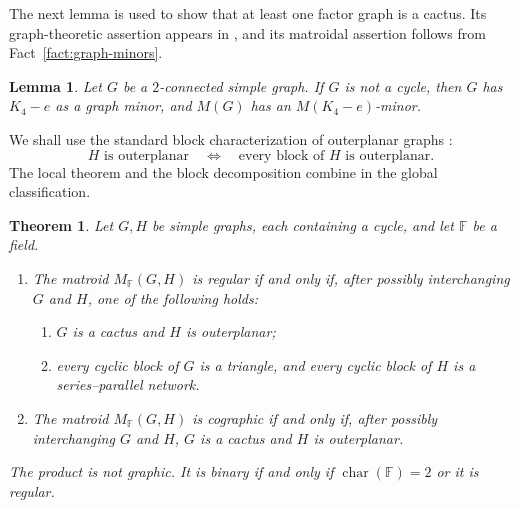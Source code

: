 \documentclass[12pt,a4paper]{article}
\numberwithin{equation}{section}
\newcommand{\F}{\mathbb F}
\newtheorem{theorem}{Theorem}[section]
\newtheorem{lemma}[lemma]{Lemma}
\theoremstyle{definition}
\theoremstyle{remark}
\begin{document}
The next lemma is used to show that at least one factor graph is a cactus.
Its graph-theoretic assertion appears in \cite[proof of Theorem~5.2]{fife-oxley}, and its matroidal assertion follows
from Fact~\ref{fact:graph-minors}.
\begin{lemma}
\label{lem:diamond-minor-in-block}
Let \(G\) be a \(2\)-connected simple graph.  If \(G\) is not a cycle, then \(G\) has \(K_4-e\) as a graph minor, and \(M(G)\) has an
\(M(K_4-e)\)-minor.
\end{lemma}
We shall use the standard block characterization of outerplanar graphs \cite[Theorem~11.8]{harary-graph-theory}:
\[
H \text{ is outerplanar}\quad\Longleftrightarrow\quad \text{every block of }H\text{ is outerplanar}.
\]
The local theorem and the block decomposition combine in the global classification.
\begin{theorem}\label{thm:global-classification}
Let \(G,H\) be simple graphs, each containing a cycle, and let
\(\F\) be a field.
\begin{enumerate}[label=\textup{(\roman*)},leftmargin=2.5em]
\item The matroid \(M_{\F}(G,H)\) is regular if and only if,
after possibly interchanging \(G\) and \(H\), one of the following
holds:
\begin{enumerate}[label=\textup{(\alph*)},leftmargin=2.5em]
\item \(G\) is a cactus and \(H\) is outerplanar;
\item every cyclic block of \(G\) is a triangle, and every cyclic
block of \(H\) is a series--parallel network.
\end{enumerate}
\item The matroid \(M_{\F}(G,H)\) is cographic if and only if,
after possibly interchanging \(G\) and \(H\), \(G\) is a cactus
and \(H\) is outerplanar.
\end{enumerate}
The product is not graphic.  It is binary if and only if
\(\operatorname{char}(\F)=2\) or it is regular.
\end{theorem}
\end{document}
